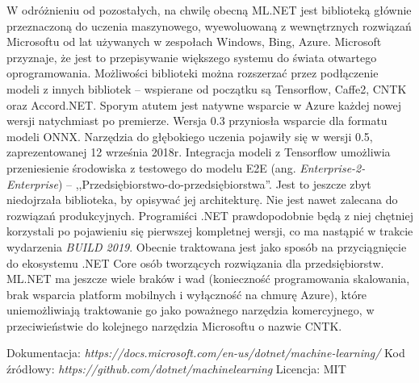 \documentclass[12pt,a4paper,twoside,titlepage,openright]{book}
\begin{document}
\begin{itemize}
W odróżnieniu od pozostałych, na chwilę obecną ML.NET jest biblioteką głównie przeznaczoną do uczenia maszynowego, wyewoluowaną z wewnętrznych rozwiązań Microsoftu od lat używanych w zespołach Windows, Bing, Azure. Microsoft przyznaje, że jest to przepisywanie większego systemu do świata otwartego oprogramowania. \cite{siteMLNet} Możliwości biblioteki można rozszerzać przez podłączenie modeli z innych bibliotek -- wspierane od początku są Tensorflow, Caffe2, CNTK oraz Accord.NET. Sporym atutem jest natywne wsparcie w Azure każdej nowej wersji natychmiast po premierze. Wersja 0.3 przyniosła wsparcie dla formatu modeli ONNX. Narzędzia do głębokiego uczenia pojawiły się w wersji 0.5, zaprezentowanej 12 września 2018r. Integracja modeli z Tensorflow umożliwia przeniesienie środowiska z testowego do modelu E2E (ang. \textit{Enterprise-2-Enterprise}) -- ,,Przedsiębiorstwo-do-przedsiębiorstwa''. Jest to jeszcze zbyt niedojrzała biblioteka, by opisywać jej architekturę. Nie jest nawet zalecana do rozwiązań produkcyjnych. Programiści .NET prawdopodobnie będą z niej chętniej korzystali po pojawieniu się pierwszej kompletnej wersji, co ma nastąpić w trakcie wydarzenia \textit{BUILD 2019}. Obecnie traktowana jest jako sposób na przyciągnięcie do ekosystemu .NET Core osób tworzących rozwiązania dla przedsiębiorstw. ML.NET ma jeszcze wiele braków i wad (konieczność programowania skalowania, brak wsparcia platform mobilnych i wyłączność na chmurę Azure), które uniemożliwiają traktowanie go jako poważnego narzędzia komercyjnego, w przeciwieństwie do kolejnego narzędzia Microsoftu o nazwie CNTK.

\noindent
\newline
Dokumentacja: \textit{https://docs.microsoft.com/en-us/dotnet/machine-learning/}
\newline
Kod źródłowy: \textit{https://github.com/dotnet/machinelearning}
\newline
Licencja: MIT


\end{itemize}
\end{document}
